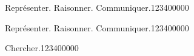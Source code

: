 \begin{pageParcoursd}
 

\begin{ExoCd}{Représenter. Raisonner. Communiquer.}{1234}{0}{0}{0}{0}{0}

 
 
\end{ExoCd}


\begin{ExoCd}{Représenter. Raisonner. Communiquer.}{1234}{0}{0}{0}{0}{0}

 
 
\end{ExoCd}







\begin{ExoCd}{Chercher.}{1234}{0}{0}{0}{0}{0}

 
 
\end{ExoCd}




\end{pageParcoursd}
 
